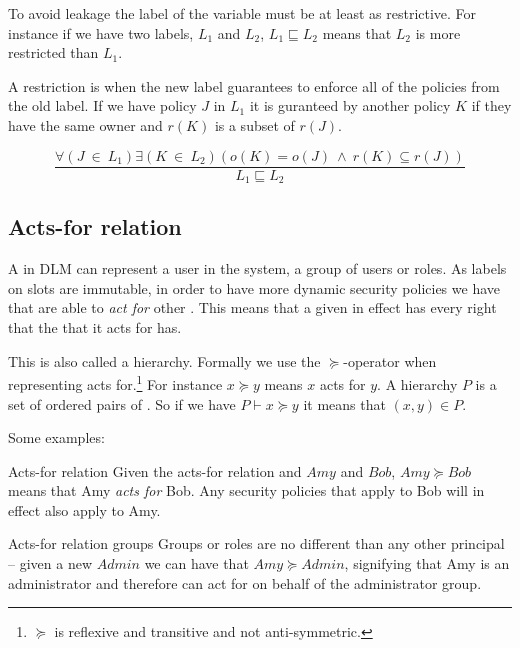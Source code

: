 To avoid leakage the label of the variable must be at least as restrictive.
For instance if we have two labels, $L_1$ and $L_2$, $L_1 \sqsubseteq L_2$ means that $L_2$ is more restricted than $L_1$.

\begin{definition}
  A restriction is when the new label guarantees to enforce all of the policies from the old label.
  If we have policy $J$ in $L_1$ it is guranteed by another policy $K$ if they have the same owner and $r(K)$ is a subset of $r(J)$.
  \begin{center}
    \[\frac{\forall (J \ \in \ L_1) \exists (K \ \in \ L_2)(o(K) = o(J) \ \wedge \ r(K) \subseteq r(J))}{L_1 \sqsubseteq L_2}\]    
  \end{center}
\end{definition}

\subsection{Acts-for relation}
A \principal{} in DLM can represent a user in the system, a group of users or roles.
As labels on slots are immutable, in order to have more dynamic security policies we have that \principals{} are able to \textit{act for} other \principals{}.
This means that a given \principal{} in effect has every right that the \principal{} that it acts for has.

This is also called a \principal{} hierarchy.
Formally we use the $\succeq$-operator when representing acts for.\footnote{$\succeq$ is reflexive and transitive and not anti-symmetric.}
For instance $x \succeq y$ means $x$ acts for $y$.
A \principal{} hierarchy $P$ is a set of ordered pairs of \principals{}.
So if we have $P \vdash x \succeq y$ it means that $(x,y) \in P$.

Some examples:
\begin{example}{Acts-for relation}
  Given the acts-for relation and \principals{} $Amy$ and $Bob$, $Amy \succeq Bob$ means that Amy \textit{acts for} Bob.
  Any security policies that apply to Bob will in effect also apply to Amy.
\end{example}
\begin{example}{Acts-for relation groups}
  Groups or roles are no different than any other principal -- given a new \principal{} $Admin$ we can have that $Amy \succeq Admin$, signifying that Amy is an administrator and therefore can act for on behalf of the administrator group. 
\end{example}
